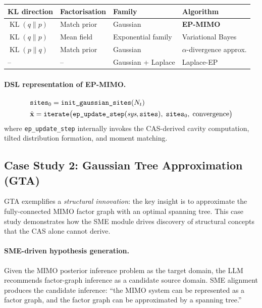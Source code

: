 \documentclass[12pt,a4paper]{article}
\newcommand{\bx}{\mathbf{x}}
\DeclareMathOperator{\KL}{KL}
\begin{document}
\vspace{0.3em}
\begin{tabular}{llll}
  \toprule
  \textbf{KL direction} & \textbf{Factorisation} & \textbf{Family} & \textbf{Algorithm} \\
  \midrule
  $\KL(q\|p)$ & Match prior & Gaussian & \textbf{EP-MIMO} \\
  $\KL(q\|p)$ & Mean field & Exponential family & Variational Bayes \\
  $\KL(p\|q)$ & Match prior & Gaussian & $\alpha$-divergence approx. \\
  -- & -- & Gaussian + Laplace & Laplace-EP \\
  \bottomrule
\end{tabular}

\paragraph{DSL representation of EP-MIMO.}
\begin{align}
  &\texttt{sites}_0 = \texttt{init\_gaussian\_sites}(N_t) \notag\\
  &\hat{\bx} = \texttt{iterate}\bigl(\texttt{ep\_update\_step}(\textit{sys}, \texttt{sites}),\;
               \texttt{sites}_0,\; \text{convergence}\bigr) \notag
\end{align}
where \texttt{ep\_update\_step} internally invokes the CAS-derived cavity
computation, tilted distribution formation, and moment matching.

\subsection{Case Study 2: Gaussian Tree Approximation (GTA)}
\label{sec:gta}

GTA \cite{gta2006} exemplifies a \emph{structural innovation}: the key insight
is to approximate the fully-connected MIMO factor graph with an optimal spanning
tree.  This case study demonstrates how the SME module drives discovery of
structural concepts that the CAS alone cannot derive.

\paragraph{SME-driven hypothesis generation.}
Given the MIMO posterior inference problem as the target domain, the LLM
recommends factor-graph inference as a candidate source domain.  SME alignment
produces the candidate inference: ``the MIMO system can be represented as a
factor graph, and the factor graph can be approximated by a spanning tree.''
\end{document}
